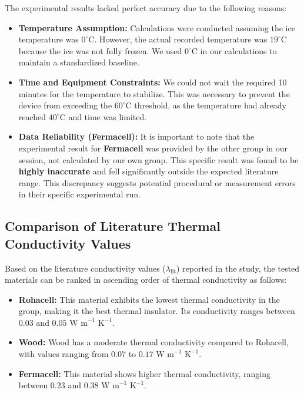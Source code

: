 \documentclass[12pt,a4paper,twoside]{article}
\begin{document}
The experimental results lacked perfect accuracy due to the following reasons:

\begin{itemize}
    \item \textbf{Temperature Assumption:} Calculations were conducted assuming the ice temperature was $0^{\circ}\text{C}$. However, the actual recorded temperature was $19^{\circ}\text{C}$ because the ice was not fully frozen. We used $0^{\circ}\text{C}$ in our calculations to maintain a standardized baseline.
    
    \item \textbf{Time and Equipment Constraints:} We could not wait the required 10 minutes for the temperature to stabilize. This was necessary to prevent the device from exceeding the $60^{\circ}\text{C}$ threshold, as the temperature had already reached $40^{\circ}\text{C}$ and time was limited.
    
    \item \textbf{Data Reliability (Fermacell):} It is important to note that the experimental result for \textbf{Fermacell} \textcolor{darkburgundy}{was provided by the other group in our session, not calculated by our own group}. This specific result was found to be \textbf{highly inaccurate} and fell significantly outside the expected literature range. This discrepancy suggests potential procedural or measurement errors in their specific experimental run.
\end{itemize}

\subsection*{Comparison of Literature Thermal Conductivity Values}

Based on the literature conductivity values ($\lambda_{\text{lit}}$) reported in the study, the tested materials can be ranked in ascending order of thermal conductivity as follows:

\begin{itemize}
    \item \textbf{Rohacell:} This material exhibits the lowest thermal conductivity in the group, making it the best thermal insulator. Its conductivity ranges between $0.03$ and $0.05 \text{ W m}^{-1} \text{ K}^{-1}$.
    
    \item \textbf{Wood:} Wood has a moderate thermal conductivity compared to Rohacell, with values ranging from $0.07$ to $0.17 \text{ W m}^{-1} \text{ K}^{-1}$.
    
    \item \textbf{Fermacell:} This material shows higher thermal conductivity, ranging between $0.23$ and $0.38 \text{ W m}^{-1} \text{ K}^{-1}$.
\end{itemize}
\end{document}
